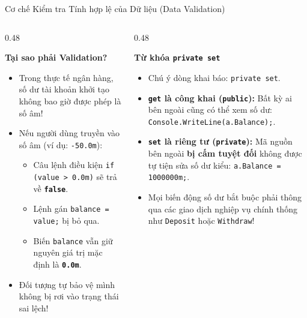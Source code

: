 \documentclass[aspectratio=169, 10pt]{beamer}
\begin{document}
\begin{frame}{Cơ chế Kiểm tra Tính hợp lệ của Dữ liệu (Data Validation)}
  \begin{columns}[T]
    \begin{column}{0.48\textwidth}
      \begin{block}{\textbf{Tại sao phải Validation?}}
        \begin{itemize}\small
          \item Trong thực tế ngân hàng, số dư tài khoản khởi tạo không bao giờ được phép là số âm!
          \item Nếu người dùng truyền vào số âm (ví dụ: \texttt{-50.0m}):
          \begin{itemize}\footnotesize
            \item Câu lệnh điều kiện \texttt{if (value > 0.0m)} sẽ trả về \textbf{\texttt{false}}.
            \item Lệnh gán \texttt{balance = value;} bị bỏ qua.
            \item Biến \texttt{balance} vẫn giữ nguyên giá trị mặc định là \textbf{\texttt{0.0m}}.
          \end{itemize}
          \item Đối tượng tự bảo vệ mình không bị rơi vào trạng thái sai lệch!
        \end{itemize}
      \end{block}
    \end{column}

    \begin{column}{0.48\textwidth}
      \begin{exampleblock}{\textbf{Từ khóa \texttt{private set}}}
        \begin{itemize}\small
          \item Chú ý dòng khai báo: \texttt{private set}.
          \item \textbf{\texttt{get} là công khai (\texttt{public}):} Bất kỳ ai bên ngoài cũng có thể xem số dư: \texttt{Console.WriteLine(a.Balance);}.
          \item \textbf{\texttt{set} là riêng tư (\texttt{private}):} Mã nguồn bên ngoài \textbf{bị cấm tuyệt đối} không được tự tiện sửa số dư kiểu: \texttt{a.Balance = 1000000m;}.
          \item Mọi biến động số dư bắt buộc phải thông qua các giao dịch nghiệp vụ chính thống như \texttt{Deposit} hoặc \texttt{Withdraw}!
        \end{itemize}
      \end{exampleblock}
    \end{column}
  \end{columns}
\end{frame}
\end{document}
